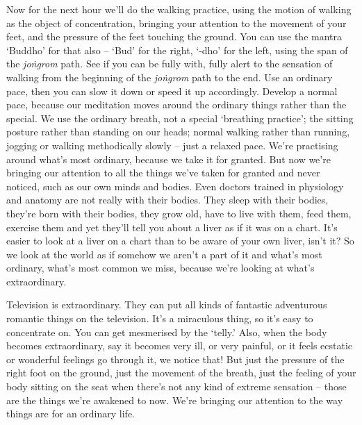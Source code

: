 
Now for the next hour we'll do the walking practice, using the motion of walking as the object of concentration, bringing your attention to the movement of your feet, and the pressure of the feet touching the ground. You can use the mantra `Buddho' for that also -- `Bud' for the right, `-dho' for the left, using the span of the \textit{joṅgrom} path. See if you can be fully with, fully alert to the sensation of walking from the beginning of the \textit{joṅgrom} path to the end. Use an ordinary pace, then you can slow it down or speed it up accordingly. Develop a normal pace, because our meditation moves around the ordinary things rather than the special. We use the ordinary breath, not a special `breathing practice'; the sitting posture rather than standing on our heads; normal walking rather than running, jogging or walking methodically slowly -- just a relaxed pace. We're practising around what's most ordinary, because we take it for granted. But now we're bringing our attention to all the things we've taken for granted and never noticed, such as our own minds and bodies. Even doctors trained in physiology and anatomy are not really with their bodies. They sleep with their bodies, they're born with their bodies, they grow old, have to live with them, feed them, exercise them and yet they'll tell you about a liver as if it was on a chart. It's easier to look at a liver on a chart than to be aware of your own liver, isn't it? So we look at the world as if somehow we aren't a part of it and what's most ordinary, what's most common we miss, because we're looking at what's extraordinary.

Television is extraordinary. They can put all kinds of fantastic adventurous romantic things on the television. It's a miraculous thing, so it's easy to concentrate on. You can get mesmerised by the `telly.' Also, when the body becomes extraordinary, say it becomes very ill, or very painful, or it feels ecstatic or wonderful feelings go through it, we notice that! But just the pressure of the right foot on the ground, just the movement of the breath, just the feeling of your body sitting on the seat when there's not any kind of extreme sensation -- those are the things we're awakened to now. We're bringing our attention to the way things are for an ordinary life.

